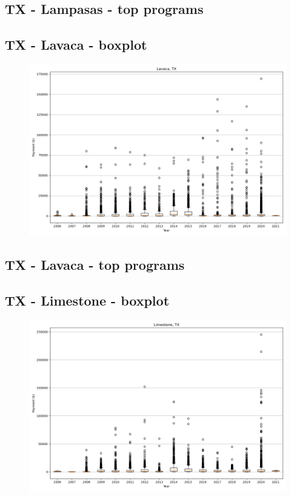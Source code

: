 \subsection*{TX - Lampasas - top programs}

\newpage
\subsection*{TX - Lavaca - boxplot}
\begin{figure}[h]
\centering
\includegraphics[width=7in]{../output/boxplots/counties/Lavaca-TX_boxplot.png}
\end{figure}


\subsection*{TX - Lavaca - top programs}

\newpage
\subsection*{TX - Limestone - boxplot}
\begin{figure}[h]
\centering
\includegraphics[width=7in]{../output/boxplots/counties/Limestone-TX_boxplot.png}
\end{figure}


